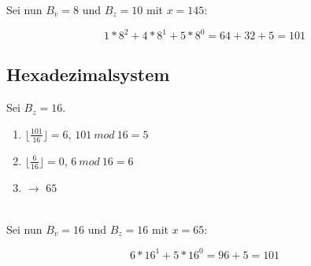 Sei nun $B_v=8$ und $B_z=10$ mit $x = 145$:

\begin{equation}
    1*8^2 + 4*8^1 + 5*8^0 = 64 + 32 + 5 = 101
\end{equation}


\subsection*{Hexadezimalsystem}
Sei $B_z = 16$.\\

\begin{enumerate}
    \item $\lfloor \frac{101}{16} \rfloor = 6$,  $101\ mod\ 16 = 5$
    \item $\lfloor \frac{6}{16} \rfloor = 0$, $6\ mod\ 16 = 6$
    \item[] $\rightarrow$ $65$
\end{enumerate}\\

Sei nun $B_v=16$ und $B_z=16$ mit $x = 65$:

\begin{equation}
    6*16^1 + 5*16^0 = 96 + 5 = 101
\end{equation}
